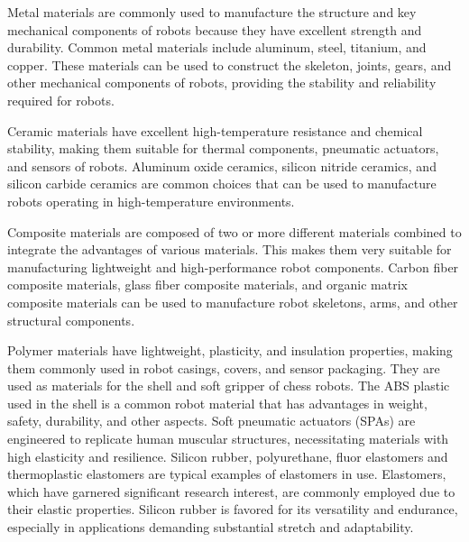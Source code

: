\documentclass[10pt, a4paper, twocolumn]{article}
\begin{document}
Metal materials are commonly used to manufacture the structure and key mechanical components of robots because they have excellent strength and durability. Common metal materials include aluminum, steel, titanium, and copper. These materials can be used to construct the skeleton, joints, gears, and other mechanical components of robots, providing the stability and reliability required for robots. 

Ceramic materials have excellent high-temperature resistance and chemical stability, making them suitable for thermal components, pneumatic actuators, and sensors of robots. Aluminum oxide ceramics, silicon nitride ceramics, and silicon carbide ceramics are common choices that can be used to manufacture robots operating in high-temperature environments. 

Composite materials are composed of two or more different materials combined to integrate the advantages of various materials. This makes them very suitable for manufacturing lightweight and high-performance robot components. Carbon fiber composite materials, glass fiber composite materials, and organic matrix composite materials can be used to manufacture robot skeletons, arms, and other structural components.

Polymer materials have lightweight, plasticity, and insulation properties, making them commonly used in robot casings, covers, and sensor packaging. They are used as materials for the shell and soft gripper of chess robots. The ABS plastic used in the shell is a common robot material that has advantages in weight, safety, durability, and other aspects. Soft pneumatic actuators (SPAs) are engineered to replicate human muscular structures, necessitating materials with high elasticity and resilience\cite{Rus2015}. Silicon rubber, polyurethane, fluor elastomers and thermoplastic elastomers are typical examples of elastomers in use.  Elastomers, which have garnered significant research interest\cite{Moseley2016}, are commonly employed due to their elastic properties. Silicon rubber is favored for its versatility and endurance, especially in applications demanding substantial stretch and adaptability\cite{Xavier2022}.
\end{document}
